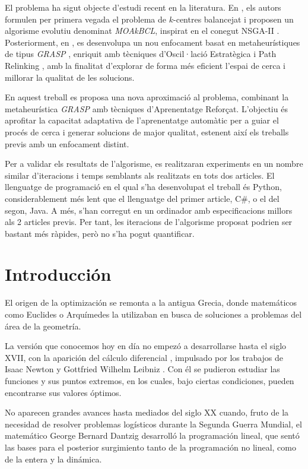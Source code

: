 \documentclass[12pt,a4paper]{book}
\begin{document}
El problema ha sigut objecte d'estudi recent en la literatura. En \cite{k-balanced_1}, els autors formulen per primera vegada el problema de $k$-centres balancejat i proposen un algorisme evolutiu denominat \textit{MOAkBCL}, inspirat en el conegut NSGA-II \citep{NSGA-II}. Posteriorment, en \cite{k-Balanced_2}, es desenvolupa un nou enfocament basat en metaheurístiques de tipus \textit{GRASP} \citep{GRASP}, enriquit amb tècniques d'Oscil·lació Estratègica \citep{oscillation} i Path Relinking \citep{path_relinking}, amb la finalitat d'explorar de forma més eficient l'espai de cerca i millorar la qualitat de les solucions.

En aquest treball es proposa una nova aproximació al problema, combinant la metaheurística \textit{GRASP} amb tècniques d'Aprenentatge Reforçat. L'objectiu és aprofitar la capacitat adaptativa de l'aprenentatge automàtic per a guiar el procés de cerca i generar solucions de major qualitat, estenent així els treballs previs amb un enfocament distint.

Per a validar els resultats de l'algorisme, es realitzaran experiments en un nombre similar d'iteracions i temps semblants als realitzats en tots dos articles. El llenguatge de programació en el qual s'ha desenvolupat el treball és Python, considerablement més lent que el llenguatge del primer article, C\#, o el del segon, Java. A més, s'han corregut en un ordinador amb especificacions millors als 2 articles previs. Per tant, les iteracions de l'algorisme proposat podrien ser bastant més ràpides, però no s'ha pogut quantificar.
\newpage
 
\chapter{Introducción}

El origen de la optimización se remonta a la antigua Grecia, donde matemáticos como Euclides o Arquímedes la utilizaban en busca de soluciones a problemas del área de la geometría.

La versión que conocemos hoy en día no empezó a desarrollarse hasta el siglo XVII, con la aparición del cálculo diferencial \citep{calculo_diferencial}, impulsado por los trabajos de Isaac Newton y Gottfried Wilhelm Leibniz \citep{Leibniz}. Con él se pudieron estudiar las funciones y sus puntos extremos,
en los cuales, bajo ciertas condiciones, pueden encontrarse sus valores óptimos.

No aparecen grandes avances hasta mediados del siglo XX cuando, fruto de la necesidad de resolver problemas logísticos durante la Segunda Guerra Mundial, el matemático George Bernard Dantzig \citep{Dantzig} desarrolló la programación lineal, que sentó las bases para el posterior surgimiento tanto de la programación no lineal, como de la entera y la dinámica.
\end{document}
